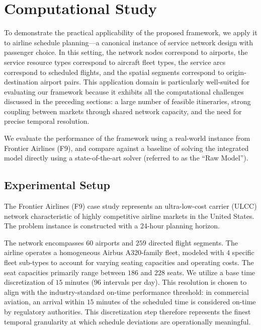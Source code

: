 \chapter{Computational Study}
\label{sec:comp_study}

To demonstrate the practical applicability of the proposed \algoNotation framework, we apply it to airline schedule planning---a canonical instance of service network design with passenger choice. In this setting, the network nodes correspond to airports, the service resource types correspond to aircraft fleet types, the service arcs correspond to scheduled flights, and the spatial segments correspond to origin-destination airport pairs. This application domain is particularly well-suited for evaluating our framework because it exhibits all the computational challenges discussed in the preceding sections: a large number of feasible itineraries, strong coupling between markets through shared network capacity, and the need for precise temporal resolution.

We evaluate the performance of the \algoNotation framework using a real-world instance from Frontier Airlines (F9), and compare against a baseline of solving the integrated model directly using a state-of-the-art solver (referred to as the ``Raw Model'').

\section{Experimental Setup}
The Frontier Airlines (F9) case study represents an ultra-low-cost carrier (ULCC) network characteristic of highly competitive airline markets in the United States. The problem instance is constructed with a 24-hour planning horizon.

The network encompasses $60$ airports and $259$ directed flight segments. The airline operates a homogeneous Airbus A320-family fleet, modeled with $4$ specific fleet sub-types to account for varying seating capacities and operating costs. The seat capacities primarily range between $186$ and $228$ seats. We utilize a base time discretization of $15$ minutes ($96$ intervals per day). This resolution is chosen to align with the industry-standard on-time performance threshold: in commercial aviation, an arrival within $15$ minutes of the scheduled time is considered on-time by regulatory authorities. This discretization step therefore represents the finest temporal granularity at which schedule deviations are operationally meaningful.

